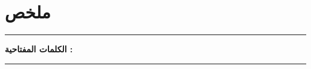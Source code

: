 \chapter*{ملخص}

%

\noindent\rule[2pt]{\textwidth}{0.5pt}

{\textbf{الكلمات المفتاحية :}}
\\
\noindent\rule[2pt]{\textwidth}{0.5pt}
